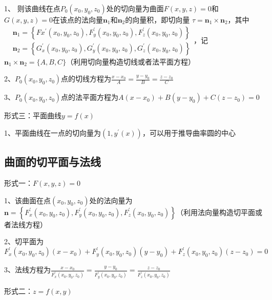 1、 则该曲线在点$P_{0}\left(x_{0}, y_{0}, z_{0}\right)$处的切向量为曲面$F(x, y, z)=0$和$G(x, y, z)=0$在该点的法向量$\boldsymbol{n}_{1}$和$\boldsymbol{n}_{2}$的向量积，即切向量 $\tau=\boldsymbol{n}_{1} \times \boldsymbol{n}_{2}$，其中$\begin{aligned} &\boldsymbol{n}_{1}=\left\{F{x}^{\prime}\left(x_{0}, y_{0}, z_{0}\right), F_{y}^{\prime}\left(x_{0}, y_{0}, z_{0}\right), F_{z}^{\prime}\left(x_{0}, y_{0}, z_{0}\right)\right\} \\ &\boldsymbol{n}_{2}=\left\{G_{x}^{\prime}\left(x_{0}, y_{0}, z_{0}\right), G_{y}^{\prime}\left(x_{0}, y_{0}, z_{0}\right), G_{z}^{\prime}\left(x_{0}, y_{0}, z_{0}\right)\right\} \end{aligned}$，记$\boldsymbol{n}_{1} \times \boldsymbol{n}_{2}=\{A, B, C\}$（利用切向量构造切线或者法平面方程）

2、$P_{0}\left(x_{0}, y_{0}, z_{0}\right)$点的切线方程为$\frac{x-x_{0}}{A}=\frac{y-y_{0}}{B}=\frac{z-z_{0}}{C}$

3、$P_{0}\left(x_{0}, y_{0}, z_{0}\right)$点的法平面方程为$A\left(x-x_{0}\right)+B\left(y-y_{0}\right)+C\left(z-z_{0}\right)=0$

形式三：平面曲线$y=f(x)$

1、平面曲线在一点的切向量为$(1,y^{\prime}(x))$，可以用于推导曲率圆的中心



\subsection{曲面的切平面与法线}

形式一：$F(x, y, z)=0$

1、该曲面在点$\left(x_{0}, y_{0}, z_{0}\right)$处的法向量为$\boldsymbol{n}=\left\{F_{x}^{\prime}\left(x_{0}, y_{0}, z_{0}\right), F_{y}^{\prime}\left(x_{0}, y_{0}, z_{0}\right), F_{z}^{\prime}\left(x_{0}, y_{0}, z_{0}\right)\right\}$（利用法向量构造切平面或者法线方程）

2、切平面为$F_{x}^{\prime}\left(x_{0}, y_{0}, z_{0}\right)\left(x-x_{0}\right)+F_{y}^{\prime}\left(x_{0}, y_{0}, z_{0}\right)\left(y-y_{0}\right)+F_{z}^{\prime}\left(x_{0}, y_{0}, z_{0}\right)\left(z-z_{0}\right)=0 $

3、法线方程为$\frac{x-x_{0}}{F_{x}^{\prime}\left(x_{0}, y_{0}, z_{0}\right)}=\frac{y-y_{0}}{F_{y}^{\prime}\left(x_{0}, y_{0}, z_{0}\right)}=\frac{z-z_{0}}{F_{z}^{\prime}\left(x_{0}, y_{0}, z_{0}\right)}$

形式二：$z=f(x, y)$

